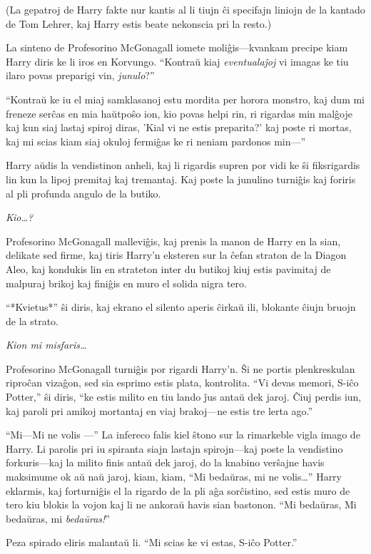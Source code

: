 (La gepatroj de Harry fakte nur kantis al li tiujn ĉi specifajn
liniojn de la kantado de Tom Lehrer, kaj Harry estis beate nekonscia
pri la resto.)

La sinteno de Profesorino McGonagall iomete moliĝis—kvankam precipe
kiam Harry diris ke li iros en Korvungo. ``Kontraŭ kiaj
\emph{eventualaĵoj} vi imagas ke tiu ilaro povas preparigi vin,
\emph{junulo}?''

``Kontraŭ ke iu el miaj samklasanoj estu mordita per horora monstro,
kaj dum mi freneze serĉas en mia haŭtpoŝo ion, kio povas helpi rin, ri
rigardas min malĝoje kaj kun siaj lastaj spiroj diras, 'Kial vi ne
estis preparita?' kaj poste ri mortas, kaj mi scias kiam siaj okuloj
fermiĝas ke ri neniam pardonos min—''

Harry aŭdis la vendistinon anheli, kaj li rigardis supren por vidi ke
ŝi fiksrigardis lin kun la lipoj premitaj kaj tremantaj. Kaj poste la
junulino turniĝis kaj foriris al pli profunda angulo de la butiko.

\emph{Kio\ldots?}

Profesorino McGonagall malleviĝis, kaj prenis la manon de Harry en la
sian, delikate sed firme, kaj tiris Harry'n eksteren sur la ĉefan straton
de la Diagon Aleo, kaj kondukis lin en strateton inter du butikoj
kiuj estis pavimitaj de malpuraj brikoj kaj finiĝis en muro el solida
nigra tero.

``*Kvietus*'' ŝi diris, kaj ekrano el silento aperis ĉirkaŭ ili,
blokante ĉiujn bruojn de la strato.

\emph{Kion mi misfaris\ldots}

Profesorino McGonagall turniĝis por rigardi Harry'n. Ŝi ne portis
plenkreskulan riproĉan vizaĝon, sed sia esprimo estis plata,
kontrolita. ``Vi devas memori, S-iĉo Potter,'' ŝi diris, ``ke estis
milito en tiu lando ĵus antaŭ dek jaroj. Ĉiuj perdis iun, kaj paroli
pri amikoj mortantaj en viaj brakoj—ne estis tre lerta ago.''

``Mi—Mi ne volis —'' La infereco falis kiel ŝtono sur la rimarkeble
vigla imago de Harry. Li parolis pri iu spiranta siajn lastajn
spirojn—kaj poste la vendistino forkuris—kaj la milito finis antaŭ
dek jaroj, do la knabino verŝajne havis maksimume ok aŭ naŭ jaroj,
kiam, kiam, ``Mi bedaŭras, mi ne volis\ldots'' Harry eklarmis, kaj
forturniĝis el la rigardo de la pli aĝa sorĉistino, sed estis muro de
tero kiu blokis la vojon kaj li ne ankoraŭ havis sian bastonon. ``Mi
bedaŭras, Mi bedaŭras, mi \emph{bedaŭras!}''

Peza spirado eliris malantaŭ li. ``Mi scias ke vi estas, S-iĉo
Potter.''

